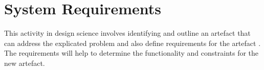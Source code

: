 \section{System Requirements}
This activity in design science involves identifying and outline an artefact that can address the explicated problem and also define requirements for the artefact \cite{johannesson2012design}. The requirements will help to determine the functionality and constraints for the new artefact. 

%
%


